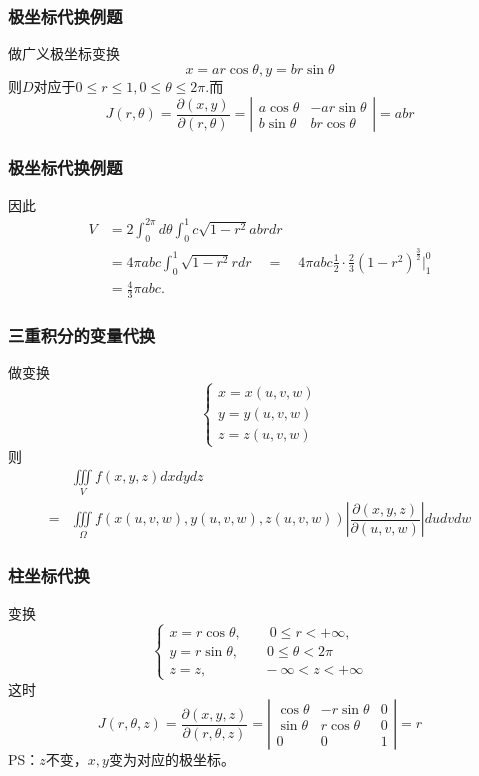 \documentclass[xetex]{beamer}
\begin{document}
\begin{frame}
    \frametitle{极坐标代换例题}
    做广义极坐标变换
    $$x=ar\cos{\theta}, y=br\sin{\theta}$$
    则$D$对应于$0\leq r \leq1, 0\leq\theta\leq2\pi.$而
    $$J(r,\theta)=\dfrac{\partial (x,y)}{\partial (r,\theta)}=\left|
        \begin{matrix}
             a\cos{\theta} & -ar\sin{\theta} \\
             b\sin{\theta} & br\cos{\theta}
         \end{matrix}
         \right|=abr$$
\end{frame}  

\begin{frame}
    \frametitle{极坐标代换例题}
    因此
    \begin{align*}
    V &= 2\int _0 ^{2 \pi} d \theta \int _0^1 c \sqrt{1 - r^2} abrdr\\
      &=4 \pi abc \int _0 ^1 \sqrt{1 - r^2} rdr \quad = \quad 4 \pi abc \frac{1}{2} \cdot \frac{2}{3} (1 - r^2) ^{\frac{3}{2}} \Big\vert _1 ^0 \\
      &= \frac{4}{3} \pi abc.
     \end{align*}
\end{frame} 

\begin{frame}
    \frametitle{三重积分的变量代换}
    做变换
    $$\begin{cases}
         x=x(u,v,w) \\
         y=y(u,v,w) \\
           z=z(u,v,w)
    \end{cases} $$   
    则
    \begin{align*}
    &\iiint\limits_V f(x,y,z) dxdydz \\
    = &\iiint\limits_\Omega f(x(u,v,w), y(u,v,w), z(u,v,w)) \left| \dfrac{\partial (x,y,z)}{\partial (u,v,w)} \right| dudvdw
    \end{align*}
\end{frame} 

\begin{frame}
    \frametitle{柱坐标代换}
    变换
    $$\begin{cases}
        x=r \cos{\theta}, \qquad 0 \leq r < + \infty, \\
        y=r \sin{\theta}, \qquad 0 \leq  \theta < 2 \pi \\
        z=z, \qquad \qquad - \infty < z < + \infty
    \end{cases}$$
    这时
    $$J(r , \theta , z) = \dfrac{\partial (x,y,z)}{\partial (r, \theta ,z)} = \left|
    \begin{matrix}
        \cos{\theta} & -r\sin{\theta} & 0 \\
        \sin{\theta} & r\cos{\theta} & 0 \\
        0  & 0 & 1
    \end{matrix} \right| = r$$
    PS：$z$不变，$x,y$变为对应的极坐标。
\end{frame} 
\end{document}
